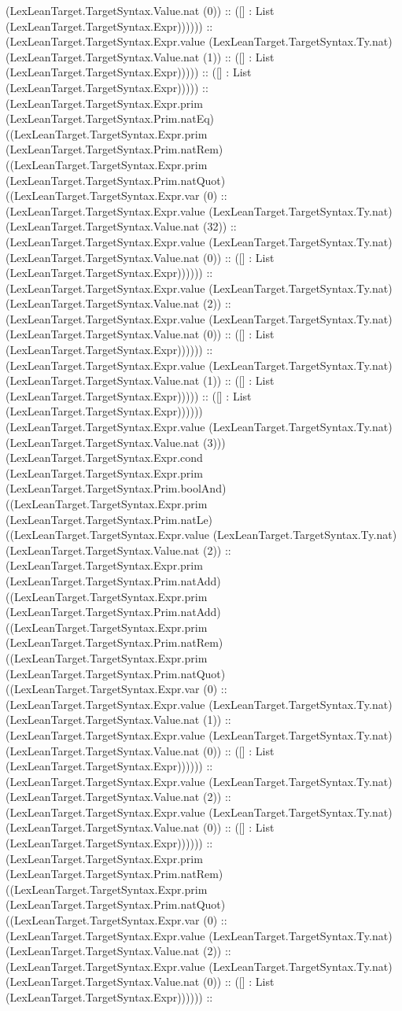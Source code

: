 \documentclass[11pt]{article}
\begin{document}
(LexLeanTarget.TargetSyntax.Value.nat (0)) :: ([] : List (LexLeanTarget.TargetSyntax.Expr)))))) :: (LexLeanTarget.TargetSyntax.Expr.value (LexLeanTarget.TargetSyntax.Ty.nat) (LexLeanTarget.TargetSyntax.Value.nat (1)) :: ([] : List (LexLeanTarget.TargetSyntax.Expr))))) :: ([] : List (LexLeanTarget.TargetSyntax.Expr))))) :: (LexLeanTarget.TargetSyntax.Expr.prim (LexLeanTarget.TargetSyntax.Prim.natEq) ((LexLeanTarget.TargetSyntax.Expr.prim (LexLeanTarget.TargetSyntax.Prim.natRem) ((LexLeanTarget.TargetSyntax.Expr.prim (LexLeanTarget.TargetSyntax.Prim.natQuot) ((LexLeanTarget.TargetSyntax.Expr.var (0) :: (LexLeanTarget.TargetSyntax.Expr.value (LexLeanTarget.TargetSyntax.Ty.nat) (LexLeanTarget.TargetSyntax.Value.nat (32)) :: (LexLeanTarget.TargetSyntax.Expr.value (LexLeanTarget.TargetSyntax.Ty.nat) (LexLeanTarget.TargetSyntax.Value.nat (0)) :: ([] : List (LexLeanTarget.TargetSyntax.Expr)))))) :: (LexLeanTarget.TargetSyntax.Expr.value (LexLeanTarget.TargetSyntax.Ty.nat) (LexLeanTarget.TargetSyntax.Value.nat (2)) :: (LexLeanTarget.TargetSyntax.Expr.value (LexLeanTarget.TargetSyntax.Ty.nat) (LexLeanTarget.TargetSyntax.Value.nat (0)) :: ([] : List (LexLeanTarget.TargetSyntax.Expr)))))) :: (LexLeanTarget.TargetSyntax.Expr.value (LexLeanTarget.TargetSyntax.Ty.nat) (LexLeanTarget.TargetSyntax.Value.nat (1)) :: ([] : List (LexLeanTarget.TargetSyntax.Expr))))) :: ([] : List (LexLeanTarget.TargetSyntax.Expr)))))) (LexLeanTarget.TargetSyntax.Expr.value (LexLeanTarget.TargetSyntax.Ty.nat) (LexLeanTarget.TargetSyntax.Value.nat (3))) (LexLeanTarget.TargetSyntax.Expr.cond (LexLeanTarget.TargetSyntax.Expr.prim (LexLeanTarget.TargetSyntax.Prim.boolAnd) ((LexLeanTarget.TargetSyntax.Expr.prim (LexLeanTarget.TargetSyntax.Prim.natLe) ((LexLeanTarget.TargetSyntax.Expr.value (LexLeanTarget.TargetSyntax.Ty.nat) (LexLeanTarget.TargetSyntax.Value.nat (2)) :: (LexLeanTarget.TargetSyntax.Expr.prim (LexLeanTarget.TargetSyntax.Prim.natAdd) ((LexLeanTarget.TargetSyntax.Expr.prim (LexLeanTarget.TargetSyntax.Prim.natAdd) ((LexLeanTarget.TargetSyntax.Expr.prim (LexLeanTarget.TargetSyntax.Prim.natRem) ((LexLeanTarget.TargetSyntax.Expr.prim (LexLeanTarget.TargetSyntax.Prim.natQuot) ((LexLeanTarget.TargetSyntax.Expr.var (0) :: (LexLeanTarget.TargetSyntax.Expr.value (LexLeanTarget.TargetSyntax.Ty.nat) (LexLeanTarget.TargetSyntax.Value.nat (1)) :: (LexLeanTarget.TargetSyntax.Expr.value (LexLeanTarget.TargetSyntax.Ty.nat) (LexLeanTarget.TargetSyntax.Value.nat (0)) :: ([] : List (LexLeanTarget.TargetSyntax.Expr)))))) :: (LexLeanTarget.TargetSyntax.Expr.value (LexLeanTarget.TargetSyntax.Ty.nat) (LexLeanTarget.TargetSyntax.Value.nat (2)) :: (LexLeanTarget.TargetSyntax.Expr.value (LexLeanTarget.TargetSyntax.Ty.nat) (LexLeanTarget.TargetSyntax.Value.nat (0)) :: ([] : List (LexLeanTarget.TargetSyntax.Expr)))))) :: (LexLeanTarget.TargetSyntax.Expr.prim (LexLeanTarget.TargetSyntax.Prim.natRem) ((LexLeanTarget.TargetSyntax.Expr.prim (LexLeanTarget.TargetSyntax.Prim.natQuot) ((LexLeanTarget.TargetSyntax.Expr.var (0) :: (LexLeanTarget.TargetSyntax.Expr.value (LexLeanTarget.TargetSyntax.Ty.nat) (LexLeanTarget.TargetSyntax.Value.nat (2)) :: (LexLeanTarget.TargetSyntax.Expr.value (LexLeanTarget.TargetSyntax.Ty.nat) (LexLeanTarget.TargetSyntax.Value.nat (0)) :: ([] : List (LexLeanTarget.TargetSyntax.Expr)))))) :: 
\end{document}
